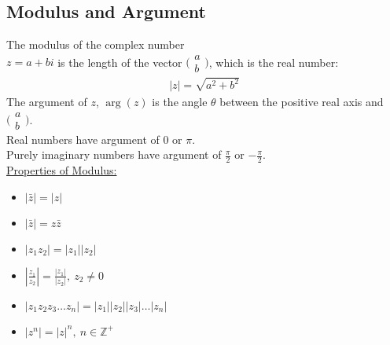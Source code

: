 \documentclass[10pt, a4paper, titlepage]{article}
\begin{document}
\begin{multicols*}{3}
	\dotfill
	\subsection{Modulus and Argument}
	The modulus of the complex number \\$z=a+bi$ is the length of the vector $\big(\begin{smallmatrix}a\\ b\end{smallmatrix}\big)$, which is the real number:
	\begin{align}
		|z|=\sqrt{a^2+b^2}
	\end{align}
	The argument of $z$, $\arg({z})$ is the angle $\theta$ between the positive real axis and $\big(\begin{smallmatrix}a\\ b\end{smallmatrix}\big)$.\\
	Real numbers have argument of 0 or $\pi$.\\
	Purely imaginary numbers have argument of $\frac{\pi}{2}$ or $-\frac{\pi}{2}$.\\

	\underline{Properties of Modulus:}
	\begin{itemize}
		\item $|\bar{z}|=|z|$
		\item $|\bar{z}|=z\bar{z}$
		\item $|z_1z_2|=|z_1||z_2|$
		\item $\left|\frac{z_1}{z_2}\right|=\frac{|z_1|}{|z_2|},\ z_2\neq 0$
		\item $|z_1z_2z_3\dots z_n|=|z_1||z_2||z_3|\dots |z_n|$
		\item $|z^n|=|z|^n,\ n\in \mathbb{Z}^+$
	\end{itemize}

	\dotfill

\end{multicols*}
\end{document}
